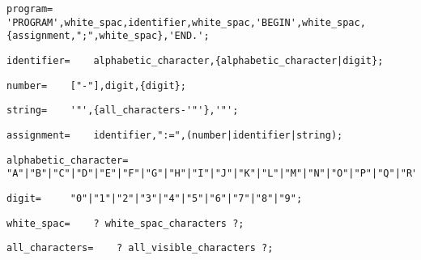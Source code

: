 \documentclass{article}
\begin{document}
    \begin{flushleft}
    \begin{lstlisting}[mathescape=true, breaklines=true]
     program= 	'PROGRAM',white_spac,identifier,white_spac,'BEGIN',white_spac,{assignment,";",white_spac},'END.';
    \end{lstlisting}
    \end{flushleft}
    \begin{flushleft}
    \begin{lstlisting}[mathescape=true, breaklines=true]
     identifier= 	alphabetic_character,{alphabetic_character|digit};
    \end{lstlisting}
    \end{flushleft}
    \begin{flushleft}
    \begin{lstlisting}[mathescape=true, breaklines=true]
     number= 	["-"],digit,{digit};
    \end{lstlisting}
    \end{flushleft}
    \begin{flushleft}
    \begin{lstlisting}[mathescape=true, breaklines=true]
     string= 	'"',{all_characters-'"'},'"';
    \end{lstlisting}
    \end{flushleft}
    \begin{flushleft}
    \begin{lstlisting}[mathescape=true, breaklines=true]
     assignment= 	identifier,":=",(number|identifier|string);
    \end{lstlisting}
    \end{flushleft}
    \begin{flushleft}
    \begin{lstlisting}[mathescape=true, breaklines=true]
     alphabetic_character= 	"A"|"B"|"C"|"D"|"E"|"F"|"G"|"H"|"I"|"J"|"K"|"L"|"M"|"N"|"O"|"P"|"Q"|"R"|"S"|"T"|"U"|"V"|"W"|"X"|"Y"|"Z";
    \end{lstlisting}
    \end{flushleft}
    \begin{flushleft}
    \begin{lstlisting}[mathescape=true, breaklines=true]
     digit= 	"0"|"1"|"2"|"3"|"4"|"5"|"6"|"7"|"8"|"9";
    \end{lstlisting}
    \end{flushleft}
    \begin{flushleft}
    \begin{lstlisting}[mathescape=true, breaklines=true]
     white_spac= 	? white_spac_characters ?;
    \end{lstlisting}
    \end{flushleft}
    \begin{flushleft}
    \begin{lstlisting}[mathescape=true, breaklines=true]
     all_characters= 	? all_visible_characters ?;
    \end{lstlisting}
    \end{flushleft}
\end{document}
